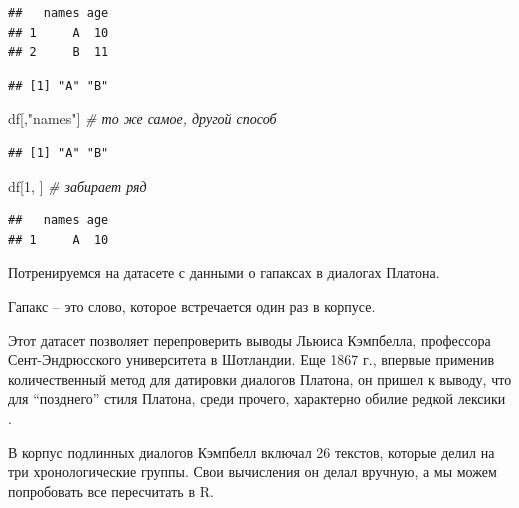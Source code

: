 \documentclass[
]{book}
\newenvironment{Shaded}{\begin{snugshade}}{\end{snugshade}}
\newcommand{\CommentTok}[1]{\textcolor[rgb]{0.56,0.35,0.01}{\textit{#1}}}
\newcommand{\DecValTok}[1]{\textcolor[rgb]{0.00,0.00,0.81}{#1}}
\newcommand{\NormalTok}[1]{#1}
\newcommand{\SpecialCharTok}[1]{\textcolor[rgb]{0.81,0.36,0.00}{\textbf{#1}}}
\newcommand{\StringTok}[1]{\textcolor[rgb]{0.31,0.60,0.02}{#1}}
\theoremstyle{definition}
\theoremstyle{definition}
\theoremstyle{definition}
\theoremstyle{definition}
\theoremstyle{remark}
\begin{document}
\begin{verbatim}
##   names age
## 1     A  10
## 2     B  11
\end{verbatim}

\begin{Shaded}
\end{Shaded}

\begin{verbatim}
## [1] "A" "B"
\end{verbatim}

\begin{Shaded}
\begin{Highlighting}[]
\NormalTok{df[,}\StringTok{"names"}\NormalTok{] }\CommentTok{\# то же самое, другой способ}
\end{Highlighting}
\end{Shaded}

\begin{verbatim}
## [1] "A" "B"
\end{verbatim}

\begin{Shaded}
\begin{Highlighting}[]
\NormalTok{df[}\DecValTok{1}\NormalTok{, ] }\CommentTok{\# забирает ряд}
\end{Highlighting}
\end{Shaded}

\begin{verbatim}
##   names age
## 1     A  10
\end{verbatim}

Потренируемся на датасете с данными о гапаксах в диалогах Платона.

Гапакс -- это слово, которое встречается один раз в корпусе.

Этот датасет позволяет перепроверить выводы Льюиса Кэмпбелла, профессора Сент-Эндрюсского университета в Шотландии. Еще 1867 г., впервые применив количественный метод для датировки диалогов Платона, он пришел к выводу, что для ``позднего'' стиля Платона, среди прочего, характерно обилие редкой лексики \citep[xxxi]{campbell1867}.

В корпус подлинных диалогов Кэмпбелл включал 26 текстов, которые делил на три хронологические группы. Свои вычисления он делал вручную, а мы можем попробовать все пересчитать в R.
\end{document}
